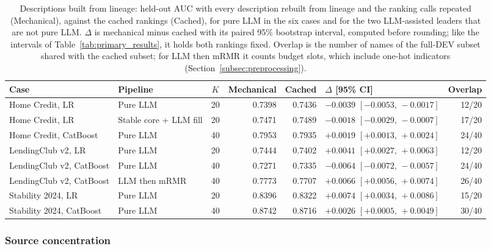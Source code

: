 \documentclass[final,5p,twocolumn]{elsarticle}
\newcommand{\Kfeat}{K}
\begin{document}
\begin{table}[htbp]
\centering
\footnotesize
\begin{threeparttable}
\caption{Descriptions built from lineage: held-out AUC with every description rebuilt from lineage and the ranking calls repeated (Mechanical), against the cached rankings (Cached), for pure LLM in the six cases and for the two LLM-assisted leaders that are not pure LLM. $\Delta$ is mechanical minus cached with its paired 95\% bootstrap interval, computed before rounding; like the intervals of Table~\ref{tab:primary_results}, it holds both rankings fixed. Overlap is the number of names of the full-DEV subset shared with the cached subset; for LLM then mRMR it counts budget slots, which include one-hot indicators (Section~\ref{subsec:preprocessing}).}
\label{tab:mechanical}
\setlength{\tabcolsep}{5pt}
\begin{tabular}{@{}llcrrlr@{}}
\toprule
Case & Pipeline & $\Kfeat$ & Mechanical & Cached & $\Delta$ [95\% CI] & Overlap \\
\midrule
Home Credit, LR & Pure LLM & 20 & 0.7398 & 0.7436 & $-0.0039$ $[-0.0053,\,-0.0017]$ & 12/20 \\
Home Credit, LR & Stable core + LLM fill & 20 & 0.7471 & 0.7489 & $-0.0018$ $[-0.0029,\,-0.0007]$ & 17/20 \\
Home Credit, CatBoost & Pure LLM & 40 & 0.7953 & 0.7935 & $+0.0019$ $[+0.0013,\,+0.0024]$ & 24/40 \\
LendingClub v2, LR & Pure LLM & 20 & 0.7444 & 0.7402 & $+0.0041$ $[+0.0027,\,+0.0063]$ & 12/20 \\
LendingClub v2, CatBoost & Pure LLM & 40 & 0.7271 & 0.7335 & $-0.0064$ $[-0.0072,\,-0.0057]$ & 24/40 \\
LendingClub v2, CatBoost & LLM then mRMR & 40 & 0.7773 & 0.7707 & $+0.0066$ $[+0.0056,\,+0.0074]$ & 26/40 \\
Stability 2024, LR & Pure LLM & 20 & 0.8396 & 0.8322 & $+0.0074$ $[+0.0034,\,+0.0086]$ & 15/20 \\
Stability 2024, CatBoost & Pure LLM & 40 & 0.8742 & 0.8716 & $+0.0026$ $[+0.0005,\,+0.0049]$ & 30/40 \\
\bottomrule
\end{tabular}
\end{threeparttable}
\end{table}

\subsubsection{Source concentration}
\label{subsec:source_concentration}
\end{document}
